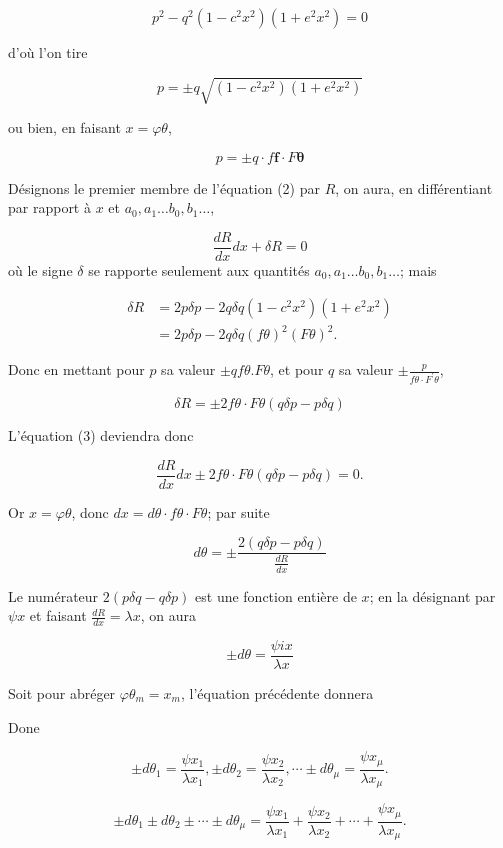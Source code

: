 \documentclass{article}
\begin{document}
\[
p^{2}-q^{2}\left(1-c^{2} x^{2}\right)\left(1+e^{2} x^{2}\right)=0
\]

d'où l'on tire

\[
p= \pm q \sqrt{\left(1-c^{2} x^{2}\right)\left(1+e^{2} x^{2}\right)}
\]

ou bien, en faisant \(x=\varphi \theta\),

\[
p= \pm q \cdot f \boldsymbol{f} \cdot F \boldsymbol{\theta}
\]

Désignons le premier membre de l'équation (2) par \(R\), on aura, en différentiant par rapport à \(x\) et \(a_{0}, a_{1} \ldots b_{0}, b_{1} \ldots\),

\[
\frac{d R}{d x} d x+\delta R=0
\]
où le signe \(\delta\) se rapporte seulement aux quantités \(a_{0}, a_{1} \ldots b_{0}, b_{1} \ldots\); mais

\[
\begin{aligned}
\delta R & =2 p \delta p-2 q \delta q\left(1-c^{2} x^{2}\right)\left(1+e^{2} x^{2}\right) \\
& =2 p \delta p-2 q \delta q(f \theta)^{2}(F \theta)^{2} .
\end{aligned}
\]

Donc en mettant pour \(p\) sa valeur \(\pm q f \theta . F \theta\), et pour \(q\) sa valeur \(\pm \frac{p}{f \theta \cdot F^{\prime} \theta}\),

\[
\delta R= \pm 2 f \theta \cdot F \theta(q \delta p-p \delta q)
\]

L'équation (3) deviendra donc

\[
\frac{d R}{d x} d x \pm 2 f \theta \cdot F \theta(q \delta p-p \delta q)=0 .
\]

Or \(x=\varphi \theta\), donc \(d x=d \theta \cdot f \theta \cdot F \theta\); par suite

\[
d \theta= \pm \frac{2(q \delta p-p \delta q)}{\frac{d R}{d x}}
\]

Le numérateur \(2(p \delta q-q \delta p)\) est une fonction entière de \(x\); en la désignant par \(\psi x\) et faisant \(\frac{d R}{d x}=\lambda x\), on aura

\[
\pm d \theta=\frac{\psi i x}{\lambda x}
\]

Soit pour abréger \(\varphi \theta_{m}=x_{m}\), l'équation précédente donnera

Done

\[
\pm d \theta_{1}=\frac{\psi x_{1}}{\lambda x_{1}}, \pm d \theta_{2}=\frac{\psi x_{2}}{\lambda x_{2}}, \cdots \pm d \theta_{\mu}=\frac{\psi x_{\mu}}{\lambda x_{\mu}} .
\]

\[
\pm d \theta_{1} \pm d \theta_{2} \pm \cdots \pm d \theta_{\mu}=\frac{\psi x_{1}}{\lambda x_{1}}+\frac{\psi x_{2}}{\lambda x_{2}}+\cdots+\frac{\psi x_{\mu}}{\lambda x_{\mu}} .
\]
\end{document}
